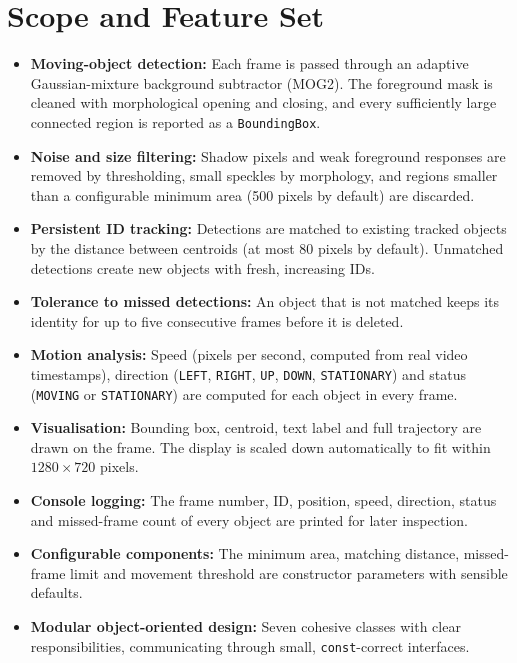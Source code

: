 \documentclass[12pt,a4paper,oneside]{book}
\begin{document}
\section{Scope and Feature Set}
\begin{itemize}
    \item \textbf{Moving-object detection:} Each frame is passed through an adaptive Gaussian-mixture background subtractor (MOG2). The foreground mask is cleaned with morphological opening and closing, and every sufficiently large connected region is reported as a \texttt{BoundingBox}.
    \item \textbf{Noise and size filtering:} Shadow pixels and weak foreground responses are removed by thresholding, small speckles by morphology, and regions smaller than a configurable minimum area (500 pixels by default) are discarded.
    \item \textbf{Persistent ID tracking:} Detections are matched to existing tracked objects by the distance between centroids (at most 80 pixels by default). Unmatched detections create new objects with fresh, increasing IDs.
    \item \textbf{Tolerance to missed detections:} An object that is not matched keeps its identity for up to five consecutive frames before it is deleted.
    \item \textbf{Motion analysis:} Speed (pixels per second, computed from real video timestamps), direction (\texttt{LEFT}, \texttt{RIGHT}, \texttt{UP}, \texttt{DOWN}, \texttt{STATIONARY}) and status (\texttt{MOVING} or \texttt{STATIONARY}) are computed for each object in every frame.
    \item \textbf{Visualisation:} Bounding box, centroid, text label and full trajectory are drawn on the frame. The display is scaled down automatically to fit within $1280\times720$ pixels.
    \item \textbf{Console logging:} The frame number, ID, position, speed, direction, status and missed-frame count of every object are printed for later inspection.
    \item \textbf{Configurable components:} The minimum area, matching distance, missed-frame limit and movement threshold are constructor parameters with sensible defaults.
    \item \textbf{Modular object-oriented design:} Seven cohesive classes with clear responsibilities, communicating through small, \texttt{const}-correct interfaces.
\end{itemize}
\end{document}
